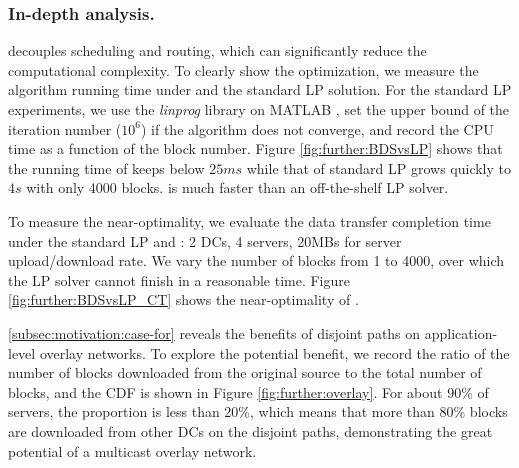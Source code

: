 \subsubsection{In-depth analysis.}
\label{subsubsec:evaluation:depth}

 \name decouples scheduling and routing, which can significantly reduce the computational complexity. To clearly show the optimization, we measure the algorithm running time under \name and the standard LP solution. For the standard LP experiments, we use the \textit{linprog} library on MATLAB \cite{mathworks}, set the upper bound of the iteration number ($10^6$) if the algorithm does not converge, and record the CPU time as a function of the block number. Figure \ref{fig:further:BDSvsLP} shows that the running time of \name keeps below $25ms$ while that of standard LP grows quickly to $4s$ with only 4000 blocks. %
\name is much faster than an off-the-shelf LP solver.

 To measure the near-optimality, we evaluate the data transfer completion time under the standard LP and \name: 2 DCs, 4 servers, 20MBs for server upload/download rate.
We vary the number of blocks from 1 to 4000, over which the LP solver cannot finish in a reasonable time. Figure \ref{fig:further:BDSvsLP_CT} shows the near-optimality of \name.%


 \Section\ref{subsec:motivation:case-for} reveals the benefits of disjoint paths on application-level overlay networks. To explore the potential benefit, we record the ratio of the number of blocks downloaded from the original source to the total number of blocks, and the CDF is shown in Figure \ref{fig:further:overlay}. For about 90\% of servers, the proportion is less than 20\%, which means that more than 80\% blocks are downloaded from other DCs on the disjoint paths, demonstrating the great potential of a multicast overlay network.



